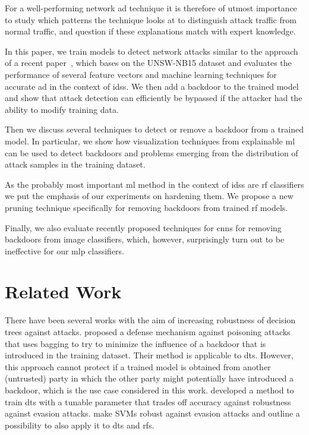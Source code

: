 \documentclass[10pt,sigconf,letterpaper,dvipsnames]{acmart}
\newcommand{\unsw}{UNSW-NB15}
\begin{document}
For a well-performing network \gls{ad} technique it is therefore of utmost importance to study which patterns the technique looks at to distinguish attack traffic from normal traffic, and question if these explanations match with expert knowledge.

In this paper, we train models to detect network attacks similar to the approach of a recent paper~\cite{meghdouri_analysis_2018}, which bases on the \unsw{} dataset \cite{moustafa_unsw-nb15:_2015} and evaluates the performance of several feature vectors and machine learning techniques for accurate \gls{ad} in the context of \glspl{ids}.
We then add a backdoor to the trained model and show that attack detection can efficiently be bypassed if the attacker had the ability to modify training data.

Then we discuss several techniques to detect or remove a backdoor from a trained model. In particular, we show how visualization techniques from explainable \gls{ml} can be used to detect backdoors and problems emerging from the distribution of attack samples in the training dataset.

As the probably most important \gls{ml} method in the context of \glspl{ids} are \gls{rf} classifiers we put the emphasis of our experiments on hardening them. We propose a new pruning technique specifically for removing backdoors from trained \gls{rf} models.

Finally, we also evaluate recently proposed techniques for \glspl{cnn} for removing backdoors from image classifiers, which, however, surprisingly turn out to be ineffective for our \gls{mlp} classifiers.

\section{Related Work}

There have been several works with the aim of increasing robustness of decision trees against attacks. \cite{biggio_bagging_2011} proposed a defense mechanism against poisoning attacks that uses bagging to try to minimize the influence of a backdoor that is introduced in the training dataset. Their method is applicable to \glspl{dt}. However, this approach cannot protect if a trained model is obtained from another (untrusted) party in which the other party might potentially have introduced a backdoor, which is the use case considered in this work. \cite{chen_robust_2019} developed a method to train \glspl{dt} with a tunable parameter that trades off accuracy against robustness against evasion attacks. \cite{russu_secure_2016} make SVMs robust against evasion attacks and outline a possibility to also apply it to \glspl{dt} and \glspl{rf}.
\end{document}

